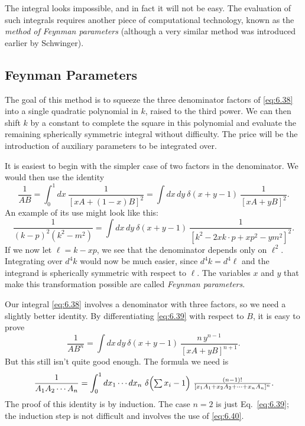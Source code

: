 The integral looks impossible, and in fact it will not be easy.  The
evaluation of such integrals requires another piece of computational
technology, known as the \emph{method of Feynman parameters} (although a very
similar method was introduced earlier by Schwinger).

\subsection{Feynman Parameters}

The goal of this method is to squeeze the three denominator factors of
\eqref{eq:6.38} into a single quadratic polynomial in $k$, raised to the third
power.  We can then shift $k$ by a constant to complete the square in this
polynomial and evaluate the remaining spherically symmetric integral without
difficulty.  The price will be the introduction of auxiliary parameters to be
integrated over.

It is easiest to begin with the simpler case of two factors in the
denominator.  We would then use the identity
\begin{equation}
  \frac{1}{AB} = \int_0^1 dx\ \frac{1}{[xA+(1-x)B]^2}
    = \int dx\,dy\ \delta(x+y-1)\ \frac{1}{[xA+yB]^2} .
  \label{eq:6.39}
\end{equation}
An example of its use might look like this:
\begin{equation}
  \frac{1}{(k-p)^2(k^2-m^2)}
  = \int dx\,dy\ \delta(x+y-1)\
    \frac{1}{[k^2 - 2xk\cdot p + xp^2 - ym^2]^2} .
\end{equation}
If we now let $\ell = k - xp$, we see that the denominator depends only on
$\ell^2$.  Integrating over $d^4k$ would now be much easier, since
$d^4k = d^4\ell$ and the integrand is spherically symmetric with respect to
$\ell$.  The variables $x$ and $y$ that make this transformation possible are
called \emph{Feynman parameters}.

Our integral \eqref{eq:6.38} involves a denominator with three factors, so we
need a slightly better identity.  By differentiating \eqref{eq:6.39} with
respect to $B$, it is easy to prove
\begin{equation}
  \frac{1}{AB^n} = \int dx\,dy\ \delta(x+y-1)\
    \frac{n\,y^{n-1}}{[xA+yB]^{n+1}} .
  \label{eq:6.40}
\end{equation}
But this still isn't quite good enough.  The formula we need is
\begin{equation}
  \frac{1}{A_1A_2\cdots A_n}
  = \int_0^1 dx_1\cdots dx_n\ \delta\Bigl( \textstyle\sum x_i - 1 \Bigr)\
    \frac{(n-1)!}{[x_1A_1 + x_2A_2 + \cdots + x_nA_n]^n} .
  \label{eq:6.41}
\end{equation}
The proof of this identity is by induction.  The case $n=2$ is just
Eq.~\eqref{eq:6.39}; the induction step is not difficult and involves the use
of \eqref{eq:6.40}.

